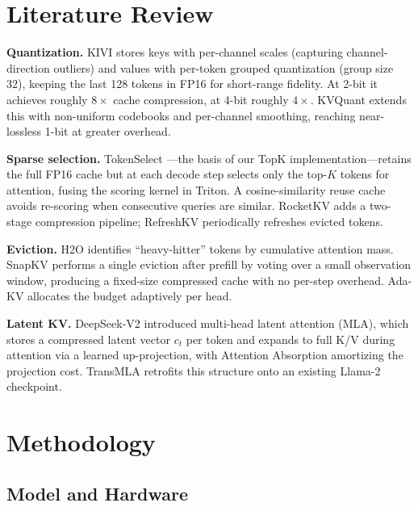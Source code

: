 \documentclass[conference]{IEEEtran}
\begin{document}
\section{Literature Review}

\textbf{Quantization.}
KIVI \cite{kivi} stores keys with per-channel scales (capturing
channel-direction outliers) and values with per-token grouped
quantization (group size 32), keeping the last 128 tokens in FP16 for
short-range fidelity.  At 2-bit it achieves roughly $8\times$ cache
compression, at 4-bit roughly $4\times$.  KVQuant \cite{kvquant}
extends this with non-uniform codebooks and per-channel smoothing,
reaching near-lossless 1-bit at greater overhead.

\textbf{Sparse selection.}
TokenSelect \cite{tokenselect}---the basis of our TopK
implementation---retains the full FP16 cache but at each decode step
selects only the top-$K$ tokens for attention, fusing the scoring
kernel in Triton.  A cosine-similarity reuse cache avoids re-scoring
when consecutive queries are similar.  RocketKV \cite{rocketkv} adds a
two-stage compression pipeline; RefreshKV \cite{refreshkv} periodically
refreshes evicted tokens.

\textbf{Eviction.}
H2O \cite{h2o} identifies ``heavy-hitter'' tokens by cumulative
attention mass.  SnapKV \cite{snapkv} performs a single eviction after
prefill by voting over a small observation window, producing a
fixed-size compressed cache with no per-step overhead.  Ada-KV
\cite{adakv} allocates the budget adaptively per head.

\textbf{Latent KV.}
DeepSeek-V2 \cite{deepseekv2} introduced multi-head latent attention
(MLA), which stores a compressed latent vector $c_t$ per token and
expands to full K/V during attention via a learned up-projection, with
Attention Absorption amortizing the projection cost.  TransMLA
\cite{transmla} retrofits this structure onto an existing Llama-2
checkpoint.

\section{Methodology}

\subsection{Model and Hardware}
\end{document}
